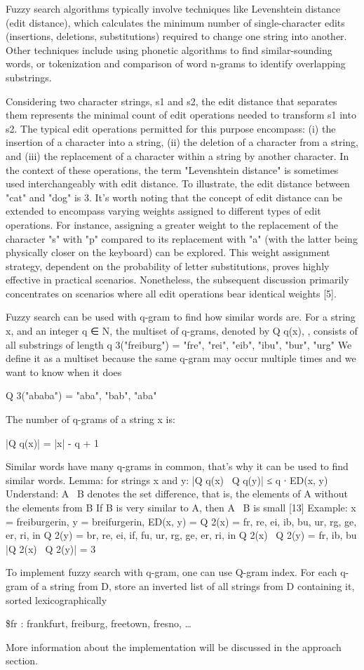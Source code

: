 Fuzzy search algorithms typically involve techniques like Levenshtein distance (edit distance), which calculates the minimum number of single-character edits (insertions, deletions, substitutions) required to change one string into another. Other techniques include using phonetic algorithms to find similar-sounding words, or tokenization and comparison of word n-grams to identify overlapping substrings.

Considering two character strings, s1 and s2, the edit distance that separates them represents the minimal count of edit operations needed to transform s1 into s2. The typical edit operations permitted for this purpose encompass: (i) the insertion of a character into a string, (ii) the deletion of a character from a string, and (iii) the replacement of a character within a string by another character. In the context of these operations, the term "Levenshtein distance" is sometimes used interchangeably with edit distance. To illustrate, the edit distance between "cat" and "dog" is 3. It's worth noting that the concept of edit distance can be extended to encompass varying weights assigned to different types of edit operations. For instance, assigning a greater weight to the replacement of the character "s" with "p" compared to its replacement with "a" (with the latter being physically closer on the keyboard) can be explored. This weight assignment strategy, dependent on the probability of letter substitutions, proves highly effective in practical scenarios. Nonetheless, the subsequent discussion primarily concentrates on scenarios where all edit operations bear identical weights [5].

Fuzzy search can be used with q-gram to find how similar words are.  For a string x, and an integer q ∈ N, the multiset of q-grams, denoted by Q q(x), , consists of all substrings of length q 3("freiburg") = { "fre", "rei", "eib", "ibu", "bur", "urg" }
We define it as a multiset because the same q-gram may occur multiple times and we want to know when it does 

Q 3("ababa") = { "aba", "bab", "aba" }

The number of q-grams of a string x is:

|Q q(x)| = |x| - q + 1

Similar words have many q-grams in common, that's why it can be used to find similar words. 
Lemma: for strings x and y: |Q q(x) \ Q q(y)| ≤ q ∙ ED(x, y)
Understand: A \ B denotes the set difference, that is, the elements of A without the elements from B If B is very similar to A, then A \ B is small [13]
Example:
x = freiburgerin, y = breifurgerin, ED(x, y) = Q 2(x) = { fr, re, ei, ib, bu, ur, rg, ge, er, ri, in } Q 2(y) = { br, re, ei, if, fu, ur, rg, ge, er, ri, in } 
Q 2(x) \ Q 2(y) = {fr, ib, bu}
|Q 2(x) \ Q 2(y)| = 3

To implement fuzzy search with q-gram, one can use Q-gram index. For each q-gram of a string from D, store an inverted list of all strings from D containing it, sorted lexicographically

\$fr : frankfurt, freiburg, freetown, fresno, …

More information about the implementation will be discussed in the approach section.